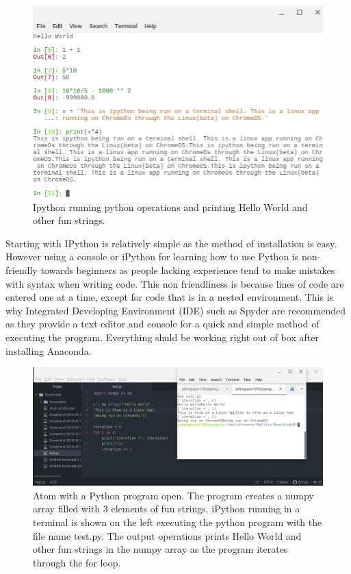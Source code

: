 \documentclass[11pt,a4paper]{book}
\begin{document}
			\begin{figure} [!ht]
				\centering
				\def\svgwidth{\columnwidth}
				\Huge
				\includegraphics[scale=0.5]{images/chapter-8/ipython_in_shell}
				\caption{Ipython running python operations and printing Hello World and other fun strings.}
				\label{fig:ipython_in_shell}
			\end{figure}
			
			Starting with IPython is relatively simple as the method of installation is easy. However using a console or iPython for learning how to use Python is non-friendly towards beginners as people lacking experience tend to make mistakes with syntax when writing code. This non friendliness is because lines of code are entered one at a time, except for code that is in a nested environment. This is why Integrated Developing Environment (IDE) such as Spyder are recommended as they provide a text editor and console for a quick and simple method of executing the program. Everything shuld be working right out of box after installing Anaconda.
			
			\begin{figure} [!ht]
				\centering
				\def\svgwidth{\columnwidth}
				\Huge
				\includegraphics[scale=0.40]{images/chapter-8/atom_IDE_and_ipython}
				\caption{Atom with a Python program open. The program creates a numpy array filled with 3 elements of fun strings. iPython running in a terminal is shown on the left executing the python program with the file name test.py. The output operations prints Hello World and other fun strings in the numpy array as the program iterates through the for loop.}
				\label{fig:atom_IDE_and_ipython}
			\end{figure}	
		
\end{document}
